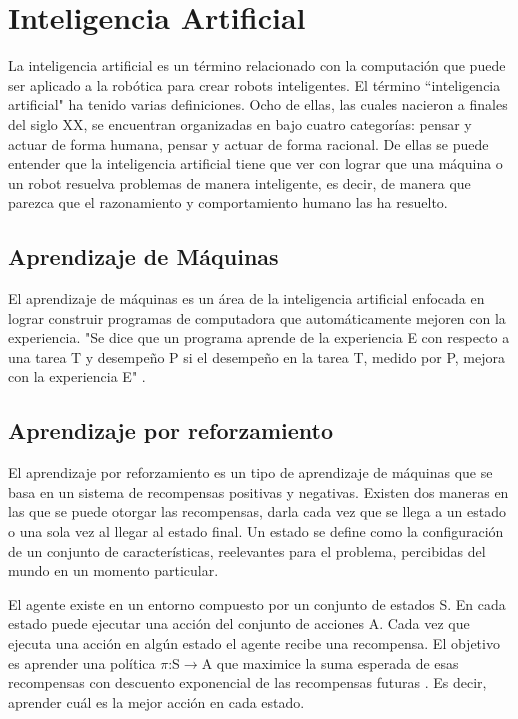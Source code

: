 \section{Inteligencia Artificial} \label{sect:Inteligencia_Artificial}
La inteligencia artificial es un término relacionado con la computación que puede ser aplicado a la robótica para crear robots inteligentes. El término ``inteligencia artificial"\:
 ha tenido varias definiciones. Ocho de ellas, las cuales nacieron a finales del siglo XX, se encuentran organizadas en \cite{peterNorvig} bajo cuatro categorías: pensar y actuar de forma humana, pensar y actuar de forma racional. De ellas se puede entender que la inteligencia artificial tiene que ver con lograr que una máquina o un robot resuelva problemas de manera inteligente, es decir, de manera que parezca que el razonamiento y comportamiento humano las ha resuelto.  

\subsection{Aprendizaje de Máquinas}

El aprendizaje de máquinas es un área de la inteligencia artificial enfocada en lograr construir programas de computadora que automáticamente mejoren con la experiencia. "Se dice que un programa aprende de la experiencia E con respecto a una tarea T y desempeño P si el desempeño en la tarea T, medido por P, mejora con la experiencia E"  \cite{Mitchell}.

\subsection{Aprendizaje por reforzamiento}
El aprendizaje por reforzamiento es un tipo de aprendizaje de máquinas que se basa en un sistema de recompensas positivas y negativas. Existen dos maneras en las que se puede otorgar las recompensas, darla cada vez que se llega a un estado o una sola vez al llegar al estado final. Un estado se define como la configuraci\'on de un conjunto de características, reelevantes para el problema, percibidas del mundo en un momento particular.

El agente existe en un entorno compuesto por un conjunto de estados S. En cada estado puede ejecutar una acción del conjunto de acciones A. Cada vez que ejecuta una acción en algún estado el agente recibe una recompensa. El objetivo es aprender una política $\pi$:S$\to$A que maximice la suma esperada de esas recompensas con descuento exponencial de las recompensas futuras \cite{Mitchell}. Es decir, aprender cuál es la mejor acción en cada estado.


